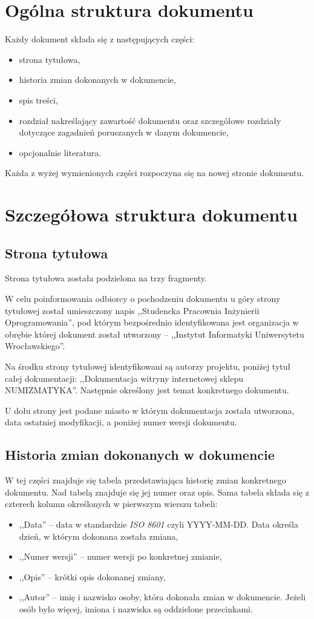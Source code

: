 \documentclass [11pt, a4paper, leqno]	{article}	%
\begin{document}
\section{Ogólna struktura dokumentu}
\noindent
Każdy dokument składa się z następujących części:
\begin{itemize}
	\item strona tytułowa,
	\item historia zmian dokonanych w dokumencie,
	\item spis treści,
	\item rozdział nakreślający zawartość dokumentu oraz szczegółowe rozdziały dotyczące zagadnień poruszanych w danym dokumencie,
	\item opcjonalnie literatura.
\end{itemize}

Każda z wyżej wymienionych części rozpoczyna się na nowej stronie dokumentu.

\section{Szczegółowa struktura dokumentu}
\subsection{Strona tytułowa}
\noindent
Strona tytułowa została podzielona na trzy fragmenty.

W celu poinformowania odbiorcy o pochodzeniu dokumentu u góry strony tytułowej został umieszczony napis ,,Studencka Pracownia Inżynierii Oprogramowania'', pod którym bezpośrednio identyfikowana jest organizacja w obrębie której dokument został utworzony -- ,,Instytut Informatyki Uniwersytetu Wrocławskiego''.

Na środku strony tytułowej identyfikowani są autorzy projektu, poniżej tytuł całej dokumentacji: ,,Dokumentacja witryny internetowej sklepu NUMIZMATYKA''.
Następnie określony jest temat konkretnego dokumentu. 

U dołu strony jest podane miasto w którym dokumentacja została utworzona, data ostatniej modyfikacji, a poniżej numer wersji dokumentu.

\subsection{Historia zmian dokonanych w dokumencie}
\noindent
W tej części znajduje się tabela przedstawiająca historię zmian konkretnego dokumentu. Nad tabelą znajduje się jej numer oraz opis. Sama tabela składa się z czterech kolumn określonych w pierwszym wierszu tabeli:
\begin{itemize}
	\item ,,Data'' -- data w standardzie \textit{ISO 8601} czyli YYYY-MM-DD. Data określa dzień, w którym dokonana została zmiana,
	\item ,,Numer wersji'' -- numer wersji po konkretnej zmianie,
	\item ,,Opis'' -- krótki opis dokonanej zmiany,
	\item ,,Autor'' -- imię i nazwisko osoby, która dokonała zmian w dokumencie. Jeżeli osób było więcej, imiona i nazwiska są oddzielone przecinkami.
\end{itemize}
\end{document}

